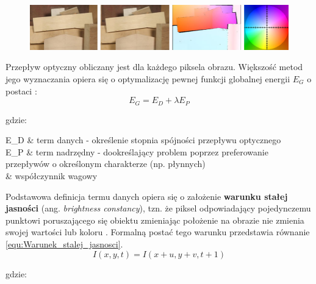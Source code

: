 \begin{figure}[!htb]
	\begin{center}
		\includegraphics[width=16cm]{images/optical_flow_example.png}
	\end{center}	
\label{fig:Przeplyw_optyczny}
\end{figure}

Przepływ optyczny obliczany jest dla każdego piksela obrazu. Większość metod jego wyznaczania opiera się o optymalizację pewnej funkcji globalnej energii $E_G$ o postaci \cite{Baker2011}:
\begin{equation}
\label{equ:Energia_globalna}
	E_G = E_D + \lambda E_P
\end{equation}

\noindent
gdzie:

\begin{conditions}
	E_D & term danych - określenie stopnia spójności przepływu optycznego \\
	E_P & term nadrzędny - dookreślający problem poprzez preferowanie przepływów o określonym charakterze (np. płynnych) \\
	\lambda & współczynnik wagowy \\
\end{conditions}

Podstawowa definicja termu danych opiera się o założenie \textbf{warunku stałej jasności} (ang. \textit{brightness constancy}), tzn. że piksel odpowiadający pojedynczemu punktowi poruszającego się obiektu zmieniając położenie na obrazie nie zmienia swojej wartości lub koloru \cite{Baker2011}. Formalną postać tego warunku przedstawia równanie \ref{equ:Warunek_stalej_jasnosci}. 
\begin{equation}
\label{equ:Warunek_stalej_jasnosci}
	I(x, y, t) = I(x + u, y + v, t + 1)
\end{equation}

\noindent
gdzie:

